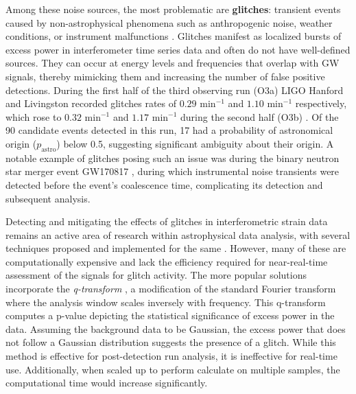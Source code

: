 \documentclass[12pt]{article}
\begin{document}
\medskip
\noindent Among these noise sources, the most problematic are \textbf{glitches}: transient events caused by non-astrophysical phenomena such as anthropogenic noise, weather conditions, or instrument malfunctions \cite{collaboration_guide_2020, collaboration_characterization_2016}. Glitches manifest as localized bursts of excess power in interferometer time series data and often do not have well-defined sources. They can occur at energy levels and frequencies that overlap with GW signals, thereby mimicking them and increasing the number of false positive detections. During the first half of the third observing run (O3a) LIGO Hanford and Livingston recorded glitches rates of $0.29\text{ min}^{-1}$ and $1.10\text{ min}^{-1}$ respectively, which rose to $0.32\text{ min}^{-1}$ and $1.17\text{ min}^{-1}$ during the second half (O3b) \cite{collaboration_gwtc-3_2023}. Of the 90 candidate events detected in this run, 17 had a probability of astronomical origin ($p_\text{astro}$) below 0.5, suggesting significant ambiguity about their origin. A notable example of glitches posing such an issue was during the binary neutron star merger event GW170817 \cite{collaboration_gw170817_2017}, during which instrumental noise transients were detected before the event's coalescence time, complicating its detection and subsequent analysis.

\medskip
\noindent Detecting and mitigating the effects of glitches in interferometric strain data remains an active area of research within astrophysical data analysis, with several techniques proposed and implemented for the same \cite{robinet_omicron_2020, MACLEOD2021100657, davis_subtracting_2022}. However, many of these are computationally expensive and lack the efficiency required for near-real-time assessment of the signals for glitch activity. The more popular solutions incorporate the \textit{q-transform} \cite{chatterji_multiresolution_2004, vazsonyi_identifying_2023}, a modification of the standard Fourier transform where the analysis window scales inversely with frequency. This q-transform computes a p-value depicting the statistical significance of excess power in the data. Assuming the background data to be Gaussian, the excess power that does not follow a Gaussian distribution suggests the presence of a glitch. While this method is effective for post-detection run analysis, it is ineffective for real-time use. Additionally, when scaled up to perform calculate on multiple samples, the computational time would increase significantly.

\end{document}
